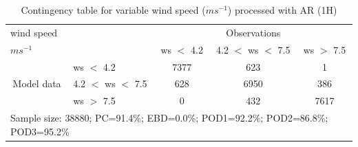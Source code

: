 \begin{table}[h!]
\begin{center}
\begin{tabular}{llccc}
\hline
{wind speed}                                       &                                                    & \multicolumn{3}{c}{Observations}                 \\
{$m s^{-1}$}                                       &                             & ws $<$ 4.2   & 4.2 $<$ ws $<$ 7.5 & ws $>$ 7.5 \\
\hline
\multicolumn{1}{c}{\multirow{3}{*}{Model data}}  & ws $<$ 4.2             & 7377                & 623                       & 1              \\
                                                 & 4.2  $<$ ws $<$ 7.5 & 628                & 6950                       & 386              \\
                                                 & ws $>$ 7.5             & 0                & 432                       & 7617              \\
\hline 
\multicolumn{5}{l}{Sample size: 38880; PC=91.4\%; EBD=0.0\%; POD1=92.2\%; POD2=86.8\%; POD3=95.2\%}                 \\
\end{tabular}
\end{center}
\caption{Contingency table for variable wind speed ($m s^{-1}$) processed with AR (1H)}
\label{tab:contingencywsAFT}
\end{table}
